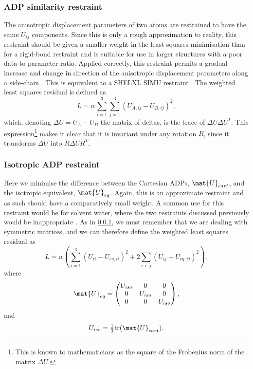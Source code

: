 \documentclass[pdf]{iucr}
\begin{document}


\subsubsection{ADP similarity restraint}
\label{ADP:similarity}
The anisotropic displacement parameters of two atoms are restrained to have the same $U_{ij}$ components. Since this is only a rough approximation to reality, this restraint should be given a smaller weight in the least squares minimisation than for a rigid-bond restraint and is suitable for use in larger structures with a poor data to parameter ratio. Applied correctly, this restraint permits a gradual increase and change in direction of the anisotropic displacement parameters along a side-chain \cite{SHELX:man97}. This is equivalent to a SHELXL SIMU restraint \cite{SHELX:man97}.
The weighted least squares residual is defined as
\begin{equation}
\label{eq:adp_similarity}
L = w \sum_{i=1}^3 \sum_{j=1}^3 (U_{A,ij} - U_{B,ij})^2,
\end{equation}
which, denoting $\Delta U=U_A - U_B$ the matrix of deltas, is the trace of $\Delta U \Delta U^T$. This expression\footnote{This is known to mathematicians as the square of the Frobenius norm of the matrix $\Delta U$.} makes it clear that it is invariant under any rotation $R$, since it transforms $\Delta U$ into $R\Delta U R^T$. 



\subsubsection{Isotropic ADP restraint}
Here we minimise the difference between the Cartesian ADPs, $\mat{U}_{cart}$, and the isotropic equivalent, $\mat{U}_{eq}$. Again, this is an approximate restraint and as such should have a comparatively small weight. A common use for this restraint would be for solvent water, where the two restraints discussed previously would be inappropriate \cite{SHELX:man97}. As in \textsection \ref{ADP:similarity}, we must remember that we are dealing with symmetric matrices, and we can therefore define the weighted least squares residual as
\begin{equation}
\label{eq:isotropic_adp}
L = w \left( \sum_{i=1}^3 (U_{ii} - U_{eq,ii})^2 + 2 \sum_{i<j} (U_{ij} - U_{eq,ij})^2 \right) ,
\end{equation}
where
\begin{equation}
\mat{U}_{eq} = 
\begin{pmatrix} U_{iso} & 0 & 0\\
  0 & U_{iso} & 0\\
  0 & 0 & U_{iso}\end{pmatrix},
\end{equation}
and
\begin{equation}
U_{iso} = \tfrac{1}{3} \mathrm{tr}(\mat{U}_{cart}).
\end{equation}
\end{document}
